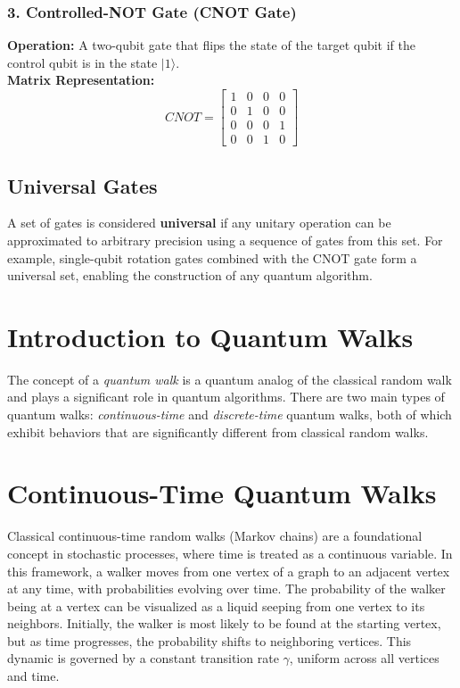 \documentclass[11pt]{article}
\theoremstyle{definition}
\begin{document}
\subsubsection*{3. Controlled-NOT Gate (CNOT Gate)}
\textbf{Operation:} A two-qubit gate that flips the state of the target qubit if the control qubit is in the state $|1\rangle$. \\
\textbf{Matrix Representation:}
\[
CNOT =
\begin{bmatrix}
1 & 0 & 0 & 0 \\
0 & 1 & 0 & 0 \\
0 & 0 & 0 & 1 \\
0 & 0 & 1 & 0
\end{bmatrix}
\]


\subsection*{Universal Gates}
A set of gates is considered \textbf{universal} if any unitary operation can be approximated to arbitrary precision using a sequence of gates from this set. For example, single-qubit rotation gates combined with the CNOT gate form a universal set, enabling the construction of any quantum algorithm.

\section{Introduction to Quantum Walks}


The concept of a \textit{quantum walk} is a quantum analog of the classical random walk and plays a significant role in quantum algorithms. There are two main types of quantum walks: \textit{continuous-time} and \textit{discrete-time} quantum walks, both of which exhibit behaviors that are significantly different from classical random walks.


\section*{Continuous-Time Quantum Walks}


Classical continuous-time random walks (Markov chains) are a foundational concept in stochastic processes, where time is treated as a continuous variable. In this framework, a walker moves from one vertex of a graph to an adjacent vertex at any time, with probabilities evolving over time. The probability of the walker being at a vertex can be visualized as a liquid seeping from one vertex to its neighbors. Initially, the walker is most likely to be found at the starting vertex, but as time progresses, the probability shifts to neighboring vertices. This dynamic is governed by a constant transition rate \( \gamma \), uniform across all vertices and time.
\end{document}
